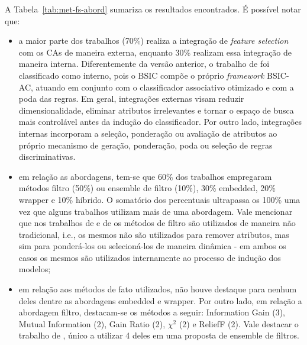 A Tabela~\ref{tab:met-fs-abord} sumariza os resultados encontrados. É possível notar que:
\begin{itemize}
    \item a maior parte dos trabalhos (70\%) realiza a integração de \textit{feature selection} com os CAs de maneira externa, enquanto 30\% realizam essa integração de maneira interna. Diferentemente da versão anterior, o trabalho de  foi classificado como interno, pois o BSIC compõe o próprio \textit{framework} BSIC-AC, atuando em conjunto com o classificador associativo otimizado e com a poda das regras. Em geral, integrações externas visam reduzir dimensionalidade, eliminar atributos irrelevantes e tornar o espaço de busca mais controlável antes da indução do classificador. Por outro lado, integrações internas incorporam a seleção, ponderação ou avaliação de atributos ao próprio mecanismo de geração, ponderação, poda ou seleção de regras discriminativas.

    \item em relação as abordagens, tem-se que 60\% dos trabalhos empregaram métodos filtro (50\%) ou ensemble de filtro (10\%), 30\% embedded, 20\% wrapper e 10\% híbrido. O somatório dos percentuais ultrapassa os 100\% uma vez que alguns trabalhos utilizam mais de uma abordagem. Vale mencionar que nos trabalhos de  e de \cite{nandhini2020performance} os métodos de filtro são utilizados de maneira não tradicional, i.e., os mesmos não são utilizados para remover atributos, mas sim para ponderá-los ou selecioná-los de maneira dinâmica - em ambos os casos os mesmos são utilizados internamente ao processo de indução dos modelos;

    \item em relação aos métodos de fato utilizados, não houve destaque para nenhum deles dentre as abordagens embedded e wrapper. Por outro lado, em relação a abordagem filtro, destacam-se os métodos a seguir: Information Gain (3), Mutual Information (2), Gain Ratio (2), $\chi^2$ (2) e ReliefF (2). Vale destacar o trabalho de , único a utilizar 4 deles em uma proposta de ensemble de filtros.
\end{itemize}

